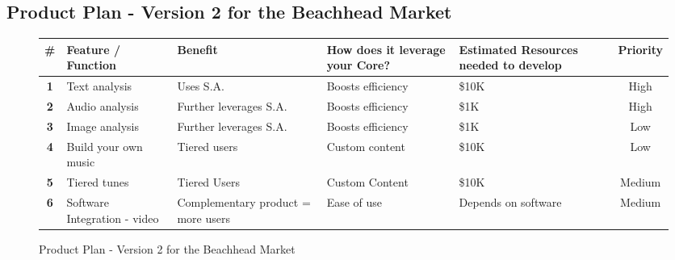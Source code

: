 \documentclass{article}
\begin{document}
    \subsection{Product Plan - Version 2 for the Beachhead Market}
    \begin{figure}[h!]
        \begin{center}
            \begin{tabular}{ | c | p{2.5cm} | p{3.5cm} | p{2.5cm} | p{2.3cm} | c |}
                \hline
                \raggedright \textbf{\#} &
                    \raggedright \textbf{Feature / Function} &
                    \raggedright \textbf{Benefit} &
                    \raggedright \textbf{How does it leverage your Core?} & \raggedright \textbf{Estimated Resources needed to develop} & \textbf{Priority} 
                \\ \hline
                \textbf{1} & Text analysis & Uses S.A. & Boosts efficiency & \$10K & High
                \\ \hline
                \textbf{2} & Audio analysis & \raggedright Further leverages S.A. & Boosts efficiency & \$1K & High
                \\ \hline
                \textbf{3} & Image analysis & \raggedright Further leverages S.A. & Boosts efficiency & \$1K & Low 
                \\ \hline
                \textbf{4} & \raggedright Build your own music & Tiered users & \raggedright Custom content & \$10K & Low
                \\ \hline
                \textbf{5} & Tiered tunes & Tiered Users & \raggedright Custom Content & \$10K & Medium
                \\ \hline
                \textbf{6} & \raggedright Software Integration - video & \raggedright Complementary product = more users & Ease of use & \raggedright Depends on software & Medium
                \\ \hline
            \end{tabular}
            \caption{Product Plan - Version 2 for the Beachhead Market}
        \end{center} 
    \end{figure}
\end{document}
